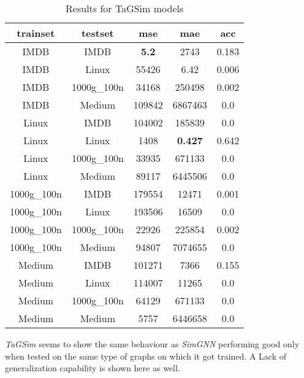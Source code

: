 \documentclass[../Thesis.tex]{subfiles}
\begin{document}
	\begin{table}[H]
		\centering
		\setlength\tabcolsep{4pt}
		\renewcommand{\arraystretch}{1.2}
		\begin{tabular}{c|c|c|c|c}
			\toprule
			\textbf{trainset} & \textbf{testset} & \textbf{mse} & \textbf{mae} & \textbf{acc} \\
			\midrule
			IMDB & IMDB & \textbf{5.2} & 2743 & 0.183 \\
			IMDB & Linux & 55426 & 6.42 & 0.006 \\
			IMDB & 1000g\_100n & 34168 & 250498 & 0.002 \\
			IMDB & Medium & 109842 & 6867463 & 0.0 \\ \midrule
			Linux & IMDB & 104002 & 185839 & 0.0 \\
			Linux & Linux & 1408 & \textbf{0.427} & 0.642 \\
			Linux & 1000g\_100n & 33935 & 671133 & 0.0 \\
			Linux & Medium & 89117 & 6445506 & 0.0 \\ \midrule
			1000g\_100n & IMDB & 179554 & 12471 & 0.001 \\
			1000g\_100n & Linux & 193506 & 16509 & 0.0 \\
			1000g\_100n & 1000g\_100n & 22926 & 225854 & 0.002 \\
			1000g\_100n & Medium & 94807 & 7074655 & 0.0 \\ \midrule
			Medium & IMDB & 101271 & 7366 & 0.155 \\
			Medium & Linux & 114007 & 11265 & 0.0 \\
			Medium & 1000g\_100n & 64129 & 671133 & 0.0 \\
			Medium & Medium & 5757 & 6446658 & 0.0 \\
			\bottomrule
		\end{tabular}
		\caption{Results for TaGSim models}
		\label{table:tagsim}
	\end{table}
	
	\emph{TaGSim} seems to show the same behaviour as \emph{SimGNN} performing good only when tested on the same type of graphs on which it got trained. A Lack of generalization capability is shown here as well.
	
\end{document}
